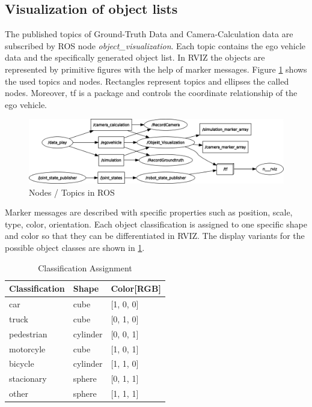 \subsection{Visualization of object lists}

The published topics of Ground-Truth Data and Camera-Calculation data are subscribed by \ac{ROS} node \textit{object\_visualization}. Each topic contains the ego vehicle data and the specifically generated object list. In \ac{RVIZ} the objects are represented by primitive figures with the help of marker messages. Figure \ref{fig:Nodes} shows the used topics and nodes. Rectangles represent topics and ellipses the called nodes. Moreover, tf is a package and controls the coordinate relationship of the ego vehicle.

\begin{figure}[thpb]
	\centering
	\includegraphics[width=0.85\linewidth]{images/rosgraph}
	\caption{Nodes / Topics in \ac{ROS}}
	\label{fig:Nodes}
\end{figure}
Marker messages are described with specific properties such as position, scale, type, color, orientation. Each object classification is assigned to one specific shape and color so that they can be differentiated in \ac{RVIZ}. The display variants for the possible object classes are shown in \cref{ClassificationAssignment}. 
\begin{table}[h]
	\caption{Classification Assignment}
	\begin{tabularx}{\columnwidth}{XXX}
		\toprule
		Classification & Shape & Color[RGB]\\
		\toprule
		car & cube & [1, 0, 0]\\
		truck & cube & [0, 1, 0]\\
		pedestrian & cylinder & [0, 0, 1]\\
		motorcyle & cube & [1, 0, 1]\\
		bicycle & cylinder & [1, 1, 0]\\
		stacionary & sphere & [0, 1, 1]\\
		other & sphere & [1, 1, 1]\\
		\bottomrule
	\end{tabularx}
	\label{ClassificationAssignment}
\end{table}

